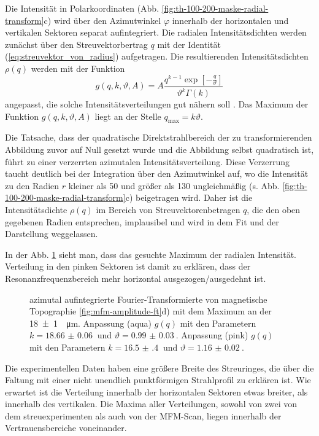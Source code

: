 \noindent
Die Intensität in Polarkoordinaten (Abb. \ref{fig:th-100-200-maske-radial-transform}c) wird über den Azimutwinkel $\varphi$ innerhalb der horizontalen und vertikalen Sektoren separat aufintegriert. Die radialen Intensitätsdichten werden zunächst über den Streuvektorbertrag $q$ mit der Identität (\ref{eq:streuvektor_von_radius}) aufgetragen. Die resultierenden Intensitätsdichten $\rho(q)$ werden mit der Funktion
\begin{equation}
    g(q, k, \vartheta, A) = A\frac{q^{k-1}\exp\left[-\frac{q}{\vartheta}\right]}{\vartheta^k\Gamma(k)}
\end{equation}
angepasst, die solche Intensitätsverteilungen gut nähern soll \cite[Kap. 5]{bagschik_employing_2016}. Das Maximum der Funktion $g(q, k, \vartheta, A)$ liegt an der Stelle $q_\text{max} = k\vartheta$.

\noindent
Die Tatsache, dass der quadratische Direktstrahlbereich der zu transformierenden Abbildung zuvor auf Null gesetzt wurde und die Abbildung selbst quadratisch ist, führt zu einer verzerrten azimutalen Intensitätsverteilung. Diese Verzerrung taucht deutlich bei der Integration über den Azimutwinkel auf, wo die Intensität zu den Radien $r$ kleiner als \SI{50}{\px} und größer als \SI{130}{\px} ungleichmäßig (s. Abb. \ref{fig:th-100-200-maske-radial-transform}c) beigetragen wird. Daher ist die Intensitätsdichte $\rho(q)$ im Bereich von Streuvektorenbetragen $q$, die den oben gegebenen Radien entsprechen, implausibel und wird in dem Fit und der Darstellung weggelassen.

\noindent
In der Abb. \ref{fig:radius_fit} sieht man, dass das gesuchte Maximum der radialen Intensität. Verteilung in den pinken Sektoren ist damit zu erklären, dass der Resonanzfrequenzbereich mehr horizontal ausgezogen/ausgedehnt ist.
\begin{figure}[H]
    \centering
    
    \caption{azimutal aufintegrierte Fourier-Transformierte von magnetische Topographie  \ref{fig:mfm-amplitude-ft}d) mit dem Maximum  an der \SI{18(1)}{\per\micro\meter}. Anpassung (aqua) $g(q)$ mit den Parametern $k = \SI{18.66(6)}{}$ und $\vartheta = \SI{0.99(3)}{}$. Anpassung (pink) $g(q)$ mit den Parametern $k = \SI{16.5(4)}{}$ und $\vartheta = \SI{1.16(2)}{}$.}
    \label{fig:radius_fit}
\end{figure}
\noindent
Die experimentellen Daten haben eine größere Breite des Streuringes, die über die Faltung mit einer nicht unendlich punktförmigen Strahlprofil zu erklären ist. Wie erwartet ist die Verteilung innerhalb der horizontalen Sektoren etwas breiter, als innerhalb des vertikalen. Die Maxima aller Verteilungen, sowohl von zwei von dem streuexperimenten als auch von der MFM-Scan, liegen innerhalb der Vertrauensbereiche voneinander.

